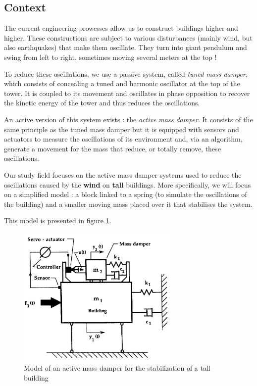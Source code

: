 \subsection{Context}
The current engineering prowesses allow us to construct buildings higher and higher. These constructions are subject to various disturbances (mainly wind, but also earthquakes) that make them oscillate. They turn into giant pendulum and swing from left to right, sometimes moving several meters at the top !\cite{YouTube_minutephysics}\par
To reduce these oscillations, we use a passive system, called {\it tuned mass damper}, which consists of concealing a tuned and harmonic oscillator at the top of the tower. It is coupled to its movement and oscillates in phase opposition to recover the kinetic energy of the tower and thus reduces the oscillations.\cite{Wikipedia_amortisseur_tmd}\par
An active version of this system exists : the {\it active mass damper}. It consists of the same principle as the tuned mass damper but it is equipped with sensors and actuators to measure the oscillations of its environment and, via an algorithm, generate a movement for the mass that reduce, or totally remove, these oscillations.\cite{sciencedirect_amd}\par
Our study field focuses on the active mass damper systems used to reduce the oscillations caused by the {\bf wind} on {\bf tall} buildings. More specifically, we will focus on a simplified model : a block linked to a spring (to simulate the oscillations of the building) and a smaller moving mass placed over it that stabilises the system.\par
This model is presented in figure \ref{fig:schema}.
\begin{figure}[!ht]
    \centering
    \includegraphics[width=0.7\textwidth]{resources/pdf/schema.pdf}
    \caption{Model of an active mass damper for the stabilization of a tall building \cite{sciencedirect_amd_2}}
    \label{fig:schema}
\end{figure}
